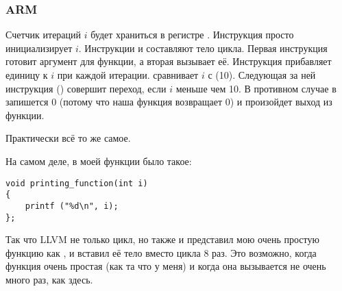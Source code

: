 \subsubsection{ARM}

\myparagraph{\NonOptimizingKeilVI (\ARMMode)}



Счетчик итераций $i$ будет храниться в регистре .
Инструкция  просто инициализирует $i$.
Инструкции  и  составляют тело цикла. 
Первая инструкция готовит аргумент для функции, \ttf а вторая вызывает её.
Инструкция  прибавляет единицу к $i$ при каждой итерации.
 сравнивает $i$ с  (10). 
Следующая за ней инструкция  () совершит переход, если $i$ меньше чем 10.
В противном случае в  запишется 0 (потому что наша функция возвращает 0) 
и произойдет выход из функции.

\myparagraph{\OptimizingKeilVI (\ThumbMode)}



Практически всё то же самое.

\myparagraph{\OptimizingXcodeIV (\ThumbTwoMode)}
\label{ARM_unrolled_loops}



На самом деле, в моей функции \ttf было такое:

\begin{lstlisting}
void printing_function(int i)
{
    printf ("%d\n", i);
};
\end{lstlisting}

Так что LLVM не только  цикл, 
но также и представил мою очень простую функцию \ttf как ,
и вставил её тело вместо цикла 8 раз. 
Это возможно, когда функция очень простая (как та что у меня) и когда
она вызывается не очень много раз, как здесь.







